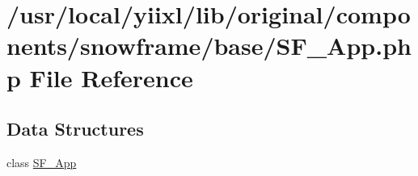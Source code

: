 \hypertarget{SF__App_8php}{
\section{/usr/local/yiixl/lib/original/components/snowframe/base/SF\_\-App.php File Reference}
\label{SF__App_8php}
}
\subsection*{Data Structures}
\begin{DoxyCompactItemize}
\item 
class \hyperlink{classSF__App}{SF\_\-App}
\end{DoxyCompactItemize}
